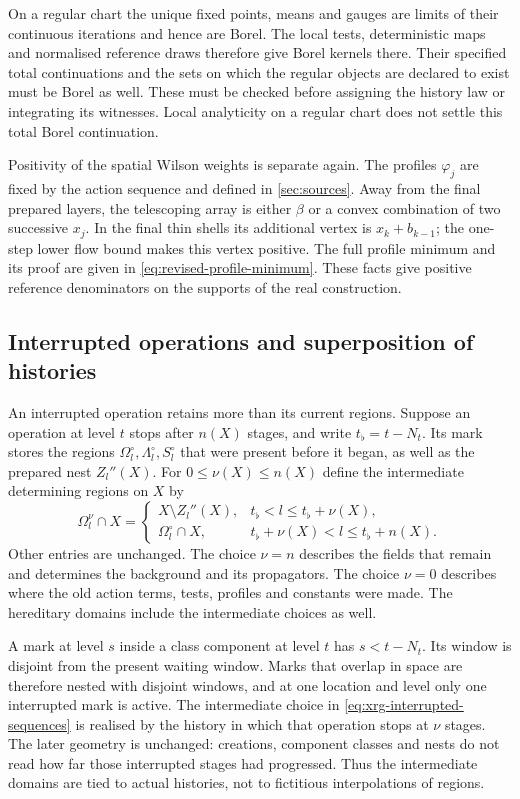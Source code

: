 \documentclass[11pt,letterpaper,reqno]{amsart}
\theoremstyle{definition}
\theoremstyle{remark}
\begin{document}
On a regular chart the unique
fixed points, means and gauges
are limits of their continuous
iterations and hence are Borel.
The local tests, deterministic
maps and normalised reference
draws therefore give Borel
kernels there. Their specified
total continuations and the
sets on which the regular
objects are declared to exist
must be Borel as well. These
must be checked before assigning
the history law or integrating
its witnesses. Local analyticity on
a regular chart does not settle
this total Borel continuation.

Positivity of the spatial Wilson weights is separate again. The
profiles $\varphi_j$ are fixed by the action sequence and defined in
\cref{sec:sources}. Away from the final prepared layers,
the telescoping array is either $\beta$ or a convex combination
of two successive $x_j$. In the final thin shells its
additional vertex is $x_k+b_{k-1}$; the one-step lower
flow bound makes this vertex positive. The full profile minimum
and its proof are given in \eqref{eq:revised-profile-minimum}. These
facts give positive reference denominators on the
supports of the real construction.

\subsection{Interrupted operations and superposition of histories}

An interrupted operation retains more than
its current regions. Suppose an operation
at level $t$ stops after $n(X)$ stages,
and write $t_\flat=t-N_t$.
Its mark stores the regions
$\Omega_l^\circ,\Lambda_l^\circ,S_l^\circ$
that were present before it began, as
well as the prepared nest $Z_l''(X)$.
For $0\le\nu(X)\le n(X)$ define the
intermediate determining regions on
$X$ by
\begin{equation}\label{eq:xrg-interrupted-sequences}
 \Omega_l^\nu\cap X=
 \begin{cases}
 X\setminus Z_l''(X),&t_\flat<l\le t_\flat+\nu(X),\\
 \Omega_l^\circ\cap X,&t_\flat+\nu(X)<l\le t_\flat+n(X).
 \end{cases}
\end{equation}
Other entries are unchanged.
The choice $\nu=n$ describes the
fields that remain and determines
the background and its propagators.
The choice $\nu=0$ describes where
the old action terms, tests,
profiles and constants were made.
The hereditary domains include
the intermediate choices as well.

A mark at level $s$ inside a class
component at level $t$ has
$s<t-N_t$. Its window is disjoint
from the present waiting window.
Marks that overlap in space are
therefore nested with disjoint
windows, and at one location and
level only one interrupted mark
is active. The intermediate choice
in \eqref{eq:xrg-interrupted-sequences}
is realised by the history in
which that operation stops at
$\nu$ stages. The later geometry
is unchanged: creations, component
classes and nests do not read how
far those interrupted stages had
progressed. Thus the intermediate
domains are tied to actual
histories, not to fictitious
interpolations of regions.
\end{document}
